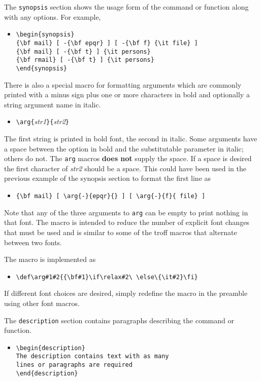 The {\tt synopsis} section shows the usage form of the command or
function along with any options.  For example,
  \begin{itemize}
    \item[]
          \verb|\begin{synopsis}|\\
          \verb|{\bf mail} [ -{\bf epqr} ] [ -{\bf f} {\it file} ]|\\
          \verb|{\bf mail} [ -{\bf t} ] {\it persons}|\\
          \verb|{\bf rmail} [ -{\bf t} ] {\it persons}|\\
          \verb|\end{synopsis}|
  \end{itemize}
There is also a special macro for formatting arguments which are
commonly printed with a minus sign plus one or more
characters in bold and optionally a string argument name in
italic.  
  \begin{itemize}
    \item[]
          \verb|\arg{|{\it str1}\verb|}{|{\it str2}\verb|}|
  \end{itemize}
The first string is printed in bold font, the second in italic.  
Some arguments have a space between the option in bold and the
substitutable parameter in italic; others do not.  The {\tt arg}
macros {\bf does not} supply the space.  If a space is desired the
first character of {\it str2} should be a space.  This could have been
used in the previous example of the synopsis section to format the
first line as  
  \begin{itemize}
    \item[]
          \verb|{\bf mail} [ \arg{-}{epqr}{} ] [ \arg{-}{f}{ file} ]|
  \end{itemize}
Note that any of the three arguments to {\tt arg} can be empty to
print nothing in that font.  The macro is intended to reduce the
number of explicit font changes that must be used and is similar to
some of the troff macros that alternate between two fonts.

The macro is implemented as 
  \begin{itemize}
    \item[]
          \verb|\def\arg#1#2{{\bf#1}\if\relax#2\ \else\{\it#2}\fi}|
  \end{itemize}
If different font choices are desired, simply redefine the macro in
the preamble using other font macros.

The {\tt description} section contains paragraphs describing the
command or function.
  \begin{itemize}
    \item[]
          \verb|\begin{description}|\\
          \verb|The description contains text with as many|\\
          \verb|lines or paragraphs are required|\\
          \verb|\end{description}|
  \end{itemize}

